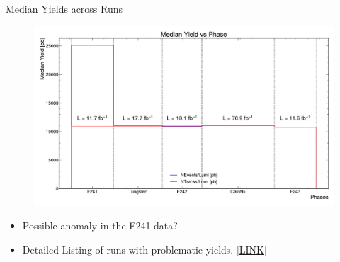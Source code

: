 
\begin{frame}{Median Yields across Runs}
	\begin{figure}
		\includegraphics[width=\linewidth]{./RunwisePlots/MedianYieldsPhase.pdf}
	\end{figure}
	\vspace{-0.5cm}
	\begin{itemize}
		\item Possible anomaly in the F241 data?
		\item Detailed Listing of runs with problematic yields. \href{https://docs.google.com/spreadsheets/d/1nnYFcmhVieSHI5XAVhPiW1K6CoGYGxv2YPchwL0sqH4/edit?usp=sharing}{[LINK]}
	\end{itemize}
\end{frame}

	


